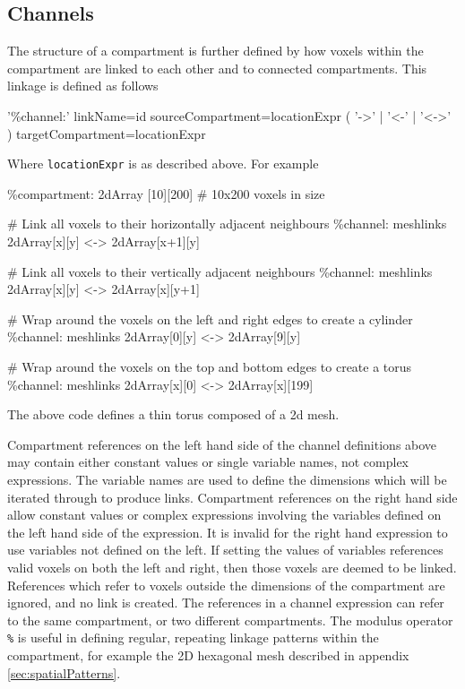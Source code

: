 \subsection{Channels}

The structure of a compartment is further defined by how voxels within the compartment are linked to each other and to connected compartments. This linkage is defined as follows
\begin{bnfsource}
'\%channel:' linkName=id sourceCompartment=locationExpr ( '->' | '<-' | '<->' )
             targetCompartment=locationExpr
\end{bnfsource}
Where \verb|locationExpr| is as described above. For example
\begin{kappasource}
\%compartment: 2dArray [10][200]    # 10x200 voxels in size 

# Link all voxels to their horizontally adjacent neighbours
\%channel: meshlinks 2dArray[x][y] <-> 2dArray[x+1][y]

# Link all voxels to their vertically adjacent neighbours
\%channel: meshlinks 2dArray[x][y] <-> 2dArray[x][y+1]

# Wrap around the voxels on the left and right edges to create a cylinder
\%channel: meshlinks 2dArray[0][y] <-> 2dArray[9][y]

# Wrap around the voxels on the top and bottom edges to create a torus
\%channel: meshlinks 2dArray[x][0] <-> 2dArray[x][199]
\end{kappasource}

The above code defines a thin torus composed of a 2d mesh.

Compartment references on the left hand side of the channel definitions above may contain either constant values or single variable names, not complex expressions. The variable names are used to define the dimensions which will be iterated through to produce links. Compartment references on the right hand side allow constant values or complex expressions involving the variables defined on the left hand side of the expression. It is invalid for the right hand expression to use variables not defined on the left. If setting the values of variables references valid voxels on both the left and right, then those voxels are deemed to be linked. References which refer to voxels outside the dimensions of the compartment are ignored, and no link is created. The references in a channel expression can refer to the same compartment, or two different compartments. The modulus operator \verb|%| is useful in defining regular, repeating linkage patterns within the compartment, for example the 2D hexagonal mesh described in appendix \ref{sec:spatialPatterns}.


